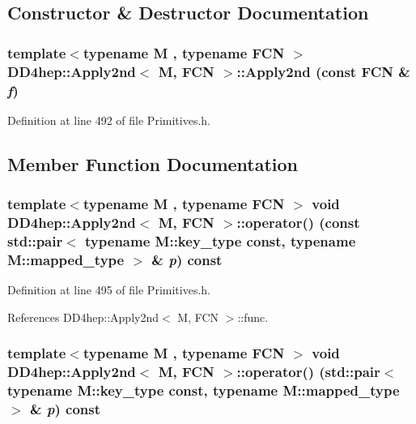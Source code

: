 \subsection{Constructor \& Destructor Documentation}
\hypertarget{class_d_d4hep_1_1_apply2nd_a89cea532d07e73253a2dcb37587d3fd7}{
\subsubsection[{Apply2nd}]{\setlength{\rightskip}{0pt plus 5cm}template$<$typename M , typename FCN $>$ {\bf DD4hep::Apply2nd}$<$ M, FCN $>$::{\bf Apply2nd} (const FCN \& {\em f})}}
\label{class_d_d4hep_1_1_apply2nd_a89cea532d07e73253a2dcb37587d3fd7}


Definition at line 492 of file Primitives.h.

\subsection{Member Function Documentation}
\hypertarget{class_d_d4hep_1_1_apply2nd_a87f622f0998bea962d6cf24afc9c52dc}{
\subsubsection[{operator()}]{\setlength{\rightskip}{0pt plus 5cm}template$<$typename M , typename FCN $>$ void {\bf DD4hep::Apply2nd}$<$ M, FCN $>$::operator() (const std::pair$<$ typename M::key\_\-type const, typename M::mapped\_\-type $>$ \& {\em p}) const}}
\label{class_d_d4hep_1_1_apply2nd_a87f622f0998bea962d6cf24afc9c52dc}


Definition at line 495 of file Primitives.h.

References DD4hep::Apply2nd$<$ M, FCN $>$::func.\hypertarget{class_d_d4hep_1_1_apply2nd_a5ef70adf6c269db5d6a3f8860d388496}{
\subsubsection[{operator()}]{\setlength{\rightskip}{0pt plus 5cm}template$<$typename M , typename FCN $>$ void {\bf DD4hep::Apply2nd}$<$ M, FCN $>$::operator() (std::pair$<$ typename M::key\_\-type const, typename M::mapped\_\-type $>$ \& {\em p}) const}}
\label{class_d_d4hep_1_1_apply2nd_a5ef70adf6c269db5d6a3f8860d388496}


